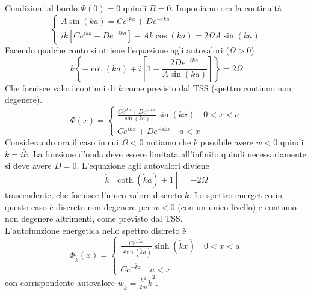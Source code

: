 \documentclass[a4paper]{article}
\begin{document}
        Condizioni al bordo $\Phi(0)=0$ quindi $B=0$.
        Imponiamo ora la continuità
        \begin{equation*}
            \begin{cases}
                A\sin(ka)=Ce^{ika}+De^{-ika}\\
                ik\left[Ce^{ika}-De^{-ika}\right]-Ak\cos(ka)=2\Omega A\sin(ka)
            \end{cases}
        \end{equation*}
        Facendo qualche conto si ottiene l'equazione agli autovalori ($\Omega>0$)
        \begin{equation*}
            k\left\{-\cot(ka)+i\left[1-\frac{2De^{-ika}}{A\sin(ka)}\right]\right\}=2\Omega
        \end{equation*}
        Che fornisce valori continui di $k$ come previsto dal TSS (spettro continuo non degenere).
        \begin{equation*}
            \Phi(x)=
            \begin{cases}
                \frac{Ce^{ika}+De^{-ika}}{\sin(ka)}\sin(kx)\quad 0<x<a\\
                Ce^{ikx}+De^{-ikx}\quad a<x
            \end{cases}
        \end{equation*}
        Considerando ora il caso in cui $\Omega<0$ notiamo che è possibile avere $w<0$ quindi $k=i\tilde{k}$.
        La funzione d'onda deve essere limitata all'infinito quindi necessariamente si deve avere $D=0$.
        L'equazione agli autovalori diviene
        \begin{equation*}
            \tilde{k}\left[\coth(\tilde{k}a)+1\right]=-2\Omega
        \end{equation*}
        trascendente, che fornisce l'unico valore discreto $\tilde{k}$.
        Lo spettro energetico in questo caso è discreto non degenere per $w<0$ (con un unico livello) e continuo non degenere altrimenti, come previsto dal TSS.\\
        L'autofunzione energetica nello spettro discreto è
        \begin{equation*}
            \Phi_{\tilde{k}}(x)=
            \begin{cases}
                \frac{Ce^{-\tilde{k}a}}{\sinh(\tilde{k}a)}\sinh(\tilde{k}x)\quad 0<x<a\\
                Ce^{-\tilde{k}x}\quad a<x
            \end{cases}
        \end{equation*}
        con corrispondente autovalore $w_{\tilde{k}}=\frac{\hbar^2}{2m}\tilde{k}^2$.
        
\end{document}

